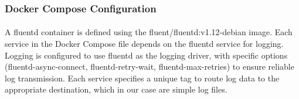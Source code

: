 \subsubsection*{Docker Compose Configuration}
\paragraph{} A fluentd container is defined using the fluent/fluentd:v1.12-debian image. Each service in the Docker Compose file depends on the fluentd service for logging. Logging is configured to use fluentd as the logging driver, with specific options (fluentd-async-connect, fluentd-retry-wait, fluentd-max-retries) to ensure reliable log transmission. Each service specifies a unique tag to route log data to the appropriate destination, which in our case are simple log files.
